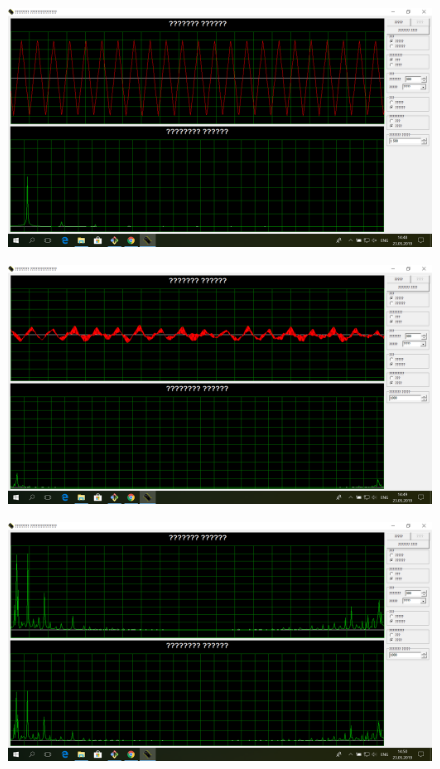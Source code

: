 \begin{figure}[H]
	\centering
	\includegraphics[width=\textwidth]{img/6.png}
	\caption{}
\end{figure}

\begin{figure}[H]
	\centering
	\includegraphics[width=\textwidth]{img/7.png}
	\caption{}
\end{figure}

\begin{figure}[H]
	\centering
	\includegraphics[width=\textwidth]{img/8.png}
	\caption{}
\end{figure}



